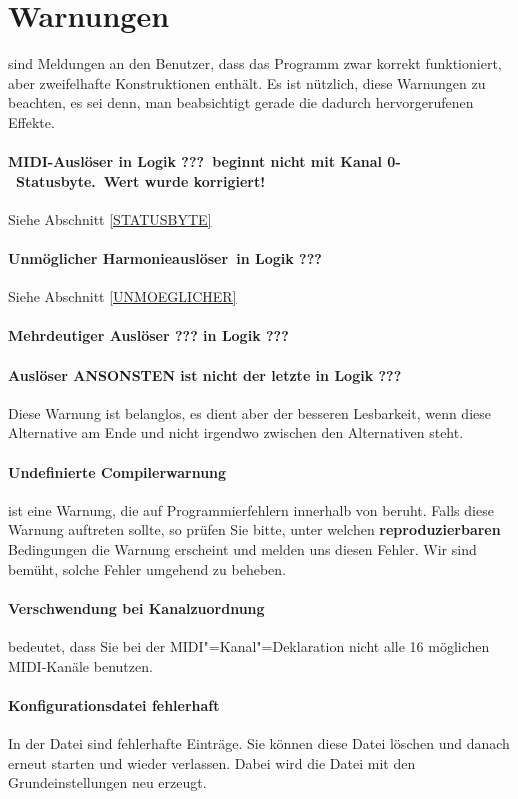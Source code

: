 \section{Warnungen}\label{sec:warnungen}
sind Meldungen an den Benutzer, dass das Programm zwar korrekt
funktioniert, aber zweifelhafte Konstruktionen enthält.  Es ist
nützlich, diese Warnungen zu beachten, es sei denn, man beabsichtigt
gerade die dadurch hervorgerufenen Effekte.
\paragraph{MIDI-Auslöser in Logik ???\ beginnt nicht mit Kanal 0-\ Statusbyte.\ Wert wurde korrigiert!}
Siehe Abschnitt \ref{STATUSBYTE}
\paragraph{Unmöglicher Harmonieauslöser\ in Logik ???}
Siehe Abschnitt \ref{UNMOEGLICHER}
\paragraph{Mehrdeutiger Auslöser ??? in Logik ???}

\paragraph{Auslöser ANSONSTEN ist nicht der letzte in Logik ???}
Diese Warnung ist belanglos, es dient aber der besseren
Lesbarkeit, wenn diese Alternative am Ende und nicht
irgendwo zwischen den Alternativen steht.
\paragraph{Undefinierte Compilerwarnung}
ist eine Warnung, die auf Programmierfehlern innerhalb von \mutabor{}
beruht. Falls diese Warnung auftreten sollte, so prüfen Sie bitte,
unter welchen \textbf{reproduzierbaren} Bedingungen die Warnung erscheint
und melden uns diesen Fehler. Wir sind bemüht, solche Fehler umgehend
zu beheben.

\paragraph{Verschwendung bei Kanalzuordnung} bedeutet, dass Sie bei der
MIDI"=Kanal"=Deklaration nicht alle 16 möglichen MIDI-Kanäle benutzen.

\paragraph{Konfigurationsdatei fehlerhaft} In der Datei  sind fehlerhafte Einträge. Sie können diese Datei
löschen und danach \mutabor{} erneut starten und wieder verlassen.
Dabei wird die Datei mit den Grundeinstellungen neu erzeugt.

